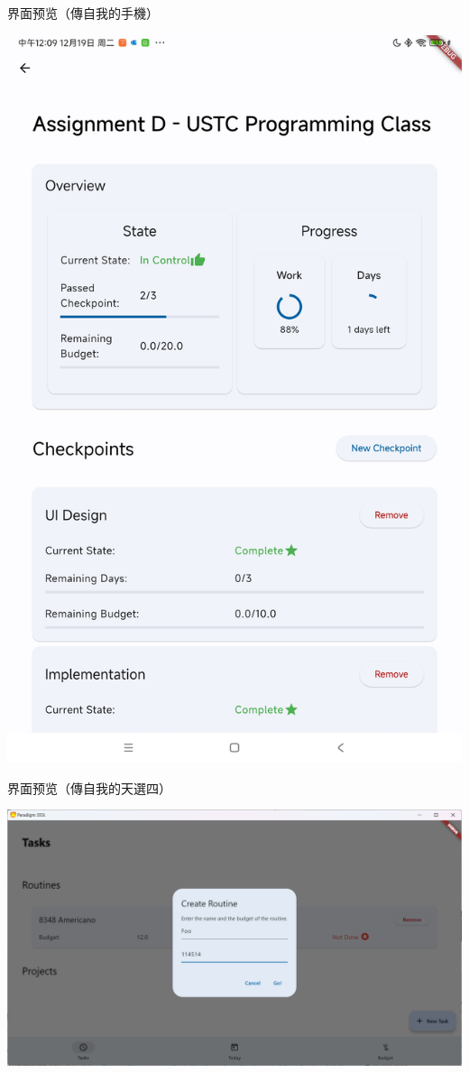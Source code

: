 \documentclass{beamer}
\begin{document}
\begin{frame}{界面预览（傳自我的手機）}
\begin{center}
\begin{minipage}[r]{.45\textwidth}
                \includegraphics[width=.85\textwidth]{page-view.jpg}
            \end{minipage}
        \end{center}
    \end{frame}

    \begin{frame}{界面预览（傳自我的天選四）}
        \begin{center}
            \includegraphics[width=.85\textwidth]{page-pc.png}
        \end{center}
    \end{frame}
\end{document}
